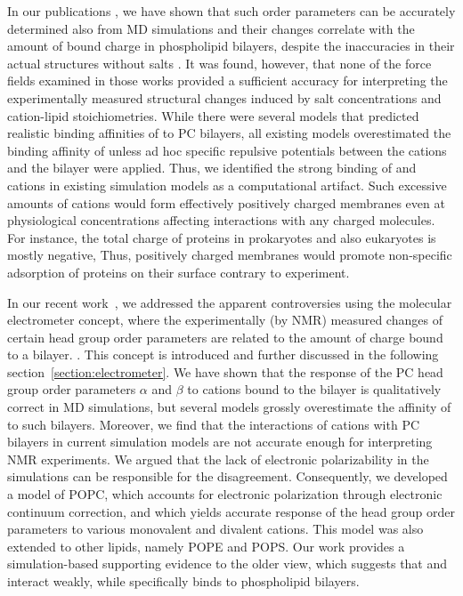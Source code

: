 \documentclass[12pt,a4paper,twoside,openright]{report}
\begin{document}
In our publications \citep{catte16, nmrlipids_proj4},
we have shown that such order parameters can be accurately determined also from MD simulations
and their changes correlate with the amount of bound charge in phospholipid bilayers, 
despite the inaccuracies in their actual structures without salts \citep{botan15}. 
It was found, however, that
none of the force fields examined in those works 
provided a sufficient accuracy for interpreting 
the experimentally measured structural changes induced by salt concentrations
and cation-lipid stoichiometries. 
While there were several models
that predicted realistic binding affinities of  to PC bilayers,
all existing models overestimated the binding affinity of 
unless ad hoc specific repulsive potentials between the cations and the bilayer were applied. \citep{catte16, nmrlipids_proj4}
Thus,
we identified the strong binding of  and  cations
in existing simulation models as a computational artifact.  
Such excessive amounts of cations 
would form effectively positively charged membranes
even at physiological concentrations
affecting interactions with any charged molecules. 
For instance,
the total charge of proteins
in prokaryotes and also eukaryotes 
is mostly negative,
\citep{link1997identifying, link1997comparing, urquhart1998comparison, schwartz2001whole, knight2004global}
Thus,
positively charged membranes would promote non-specific adsorption of proteins on their surface 
contrary to experiment.  
\citep{junkova2016, lingwood2010lipid, sekerevs2015song} 




In our recent work~\citep{catte16}, we addressed the apparent controversies 
using the molecular electrometer concept, 
where the experimentally (by NMR) measured changes of certain head group order parameters 
are related to the amount of charge bound to a bilayer. \citep{brown77,akutsu81,altenbach84,seelig87,scherer89}.
This concept is introduced and further discussed in the following section~\ref{section:electrometer}. 
We have shown that the response of the PC head group order parameters $\alpha$ and $\beta$ 
to cations bound to the bilayer is qualitatively correct in MD simulations, 
but several models grossly overestimate the affinity of  to such bilayers. 
Moreover, we find that the interactions of  cations with PC bilayers
in current simulation models are not accurate enough for interpreting NMR experiments. 
We argued that the lack of electronic polarizability in the simulations 
can be responsible for the disagreement. 
Consequently, we developed a model of POPC, 
which accounts for electronic polarization through electronic continuum correction, 
and which yields accurate response of the head group order parameters to various monovalent and divalent cations. \citep{melcr18}
This model was also extended to other lipids, namely POPE and POPS.
Our work provides a simulation-based supporting evidence to the older view,
which suggests that  and  interact weakly, 
while  specifically binds to phospholipid bilayers. 
\end{document}
